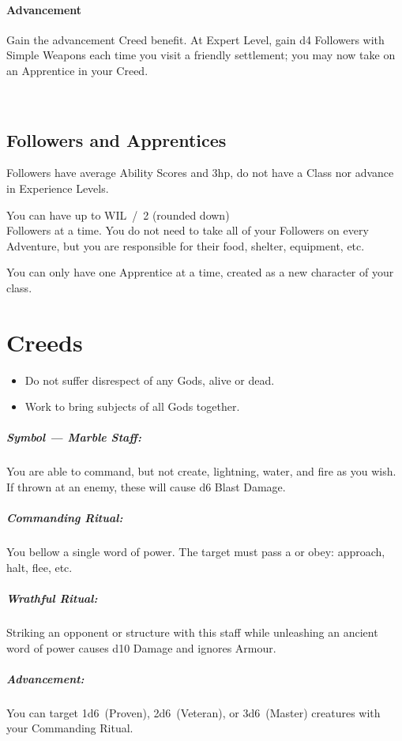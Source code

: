 \documentclass[itdr]{subfiles}
\begin{document}
\paragraph{Advancement}
Gain the advancement Creed benefit. At Expert Level, gain d4 Followers with Simple Weapons each time you visit a friendly settlement; you may now take on an Apprentice in your Creed.

\vfill
{}
~\\

\subsection{Followers and Apprentices}
Followers have average Ability Scores and 3hp, do not have a Class nor advance in Experience Levels.

You can have up to WIL~/~2 (rounded down)\\Followers at a time. You do not need to take all of your Followers on every Adventure, but you are responsible for their food, shelter, equipment, etc.

You can only have one Apprentice at a time, created as a new character of your class.

\break

\section{Creeds}

{\em\begin{itemize}
		\item Do not suffer disrespect of any Gods, alive or dead.
		\item Work to bring subjects of all Gods together.
\end{itemize}}

\subparagraph{Symbol --- Marble Staff:} You are able to command, but not create, lightning, water, and fire as you wish. If thrown at an enemy, these will cause d6 Blast Damage.

\subparagraph{Commanding Ritual:} You bellow a single word of power. The target must pass a  or obey: approach, halt, flee, etc.

\subparagraph{Wrathful Ritual:} Striking an opponent or structure with this staff while unleashing an ancient word of power causes d10 Damage and ignores Armour.

\subparagraph{Advancement:} You can target 1d6~(Proven), 2d6~(Veteran), or 3d6~(Master) creatures with your Commanding Ritual.
\end{document}
